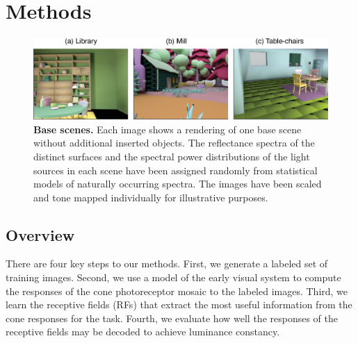 \documentclass{jov}
\begin{document}
\section*{Methods} \label{Methods}
\begin{figure}
\centering
\includegraphics[width=\textwidth]{Figure2.eps}
    \caption{{\bf Base scenes.} Each image shows a rendering of one base scene without additional inserted objects.  The reflectance spectra of the distinct surfaces and the spectral power distributions of the light sources in each scene have been assigned randomly from statistical models of naturally occurring spectra. The images have been scaled and tone mapped individually for illustrative purposes.}
\label{fig:baseScenes}
\end{figure}

\subsection{Overview}
There are four key steps to our methods.  First, we generate a labeled set of training images.  Second, we use a model of the early visual system to compute the responses of the cone photoreceptor mosaic to the labeled images. Third, we learn the receptive fields (RFs) that extract the most useful information from the cone responses for the task. Fourth, we evaluate how well the responses of the receptive fields may be decoded to achieve luminance constancy.
\end{document}

